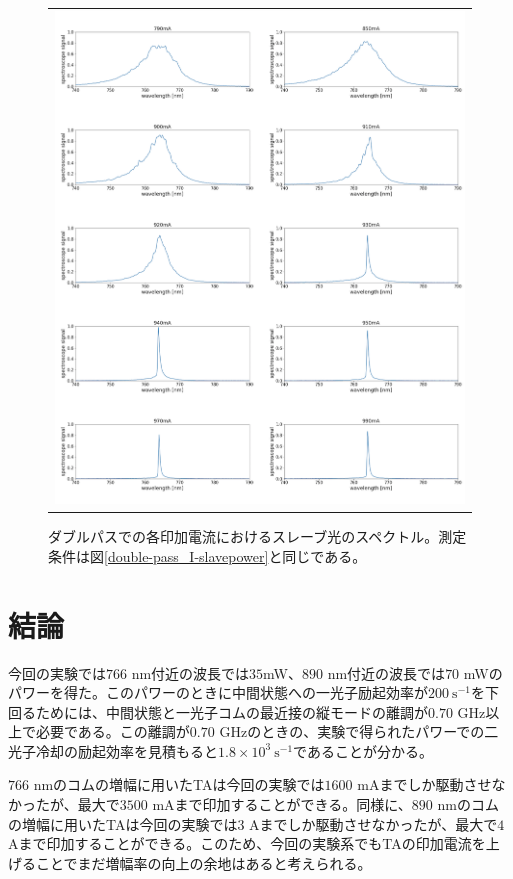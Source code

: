 \documentclass[uplatex, dvipdfmx, a4paper, report, papersize, 11pt]{jsbook}
\begin{document}
\begin{figure}[H]
\begin{tabular}{c}
      \begin{minipage}{1\hsize}
        \centering
          \includegraphics[keepaspectratio,  scale=0.340,  angle=0]
                          {figures/chapter4/double-pass-Slave-Spectrum.png}
                          \caption{ダブルパスでの各印加電流におけるスレーブ光のスペクトル。測定条件は図\ref{double-pass_I-slavepower}と同じである。}
                          \label{double-pass_I-Slave}

      \end{minipage}


    \end{tabular}
\end{figure}
\section{結論}

今回の実験では$766$ nm付近の波長では$35$mW、$890$ nm付近の波長では$70$ mWのパワーを得た。このパワーのときに中間状態への一光子励起効率が$200\ \mathrm{s^{-1}}$を下回るためには、中間状態と一光子コムの最近接の縦モードの離調が$0.70$ GHz以上で必要である。この離調が$0.70$ GHzのときの、実験で得られたパワーでの二光子冷却の励起効率を見積もると$1.8\times10^3\ \mathrm{s^{-1}}$であることが分かる。\par
$766$ nmのコムの増幅に用いたTAは今回の実験では$1600$ mAまでしか駆動させなかったが、最大で$3500$ mAまで印加することができる。同様に、$890$ nmのコムの増幅に用いたTAは今回の実験では$3$ Aまでしか駆動させなかったが、最大で$4$ Aまで印加することができる。このため、今回の実験系でもTAの印加電流を上げることでまだ増幅率の向上の余地はあると考えられる。\par
\end{document}
